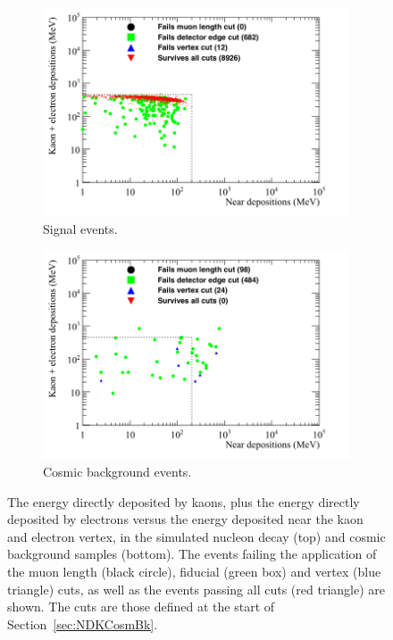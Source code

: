 \begin{figure}
  \centering
  \begin{subfigure}{0.8\textwidth}
    \includegraphics[width=\textwidth]{NucleonDecay_KaonElec_vs_Near_Can}
    \caption{Signal events.}
    \label{fig:NDK_KaonElec_Near_EDist_Sig}
  \end{subfigure}
  \begin{subfigure}{0.8\textwidth}
    \includegraphics[width=\textwidth]{CosmicBackground_KaonElec_vs_Near_Can}
    \caption{Cosmic background events.}
    \label{fig:NDK_KaonElec_Near_EDist_Cosmo}
  \end{subfigure}
  \caption[The energy directly deposited by kaons, plus the energy directly deposited by electrons versus the energy deposited near the kaon and electron vertex, in the simulated nucleon decay and cosmic background samples]
          {The energy directly deposited by kaons, plus the energy directly deposited by electrons versus the energy deposited near the kaon and electron vertex, in the simulated nucleon decay (top) and cosmic background samples (bottom). The events failing the application of the muon length (black circle), fiducial (green box) and vertex (blue triangle) cuts, as well as the events passing all cuts (red triangle) are shown. The cuts are those defined at the start of Section~\ref{sec:NDKCosmBk}.}
  \label{fig:NDK_KaonElec_Near_EDist}
\end{figure}

